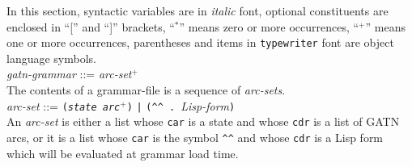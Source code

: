 \documentclass{book}
\begin{document}
In this section, syntactic variables are in {\it italic} font, optional constituents are enclosed in
``['' and ``]'' brackets, ``$^*$'' means zero or more occurrences, ``$^+$'' means one or more occurrences,
parentheses and items in {\tt typewriter} font are object language symbols. \\[2ex]
{\it gatn-grammar} ::= {\it arc-set}$^+$ \\
The contents of a grammar-file is a sequence of {\it arc-sets}. \\[2ex]
{\it arc-set} ::= {\tt ({\it state} {\it arc}$^+$)} \verb.|. \verb|(^^ . |{\it Lisp-form}\verb|)| \\
An {\it arc-set} is either a list whose {\tt car} is a state and whose {\tt cdr} is a list of GATN
arcs, or it is a list whose {\tt car} is the symbol \verb|^^| and whose {\tt cdr} is a Lisp form
which will be evaluated at grammar load time.
\end{document}
